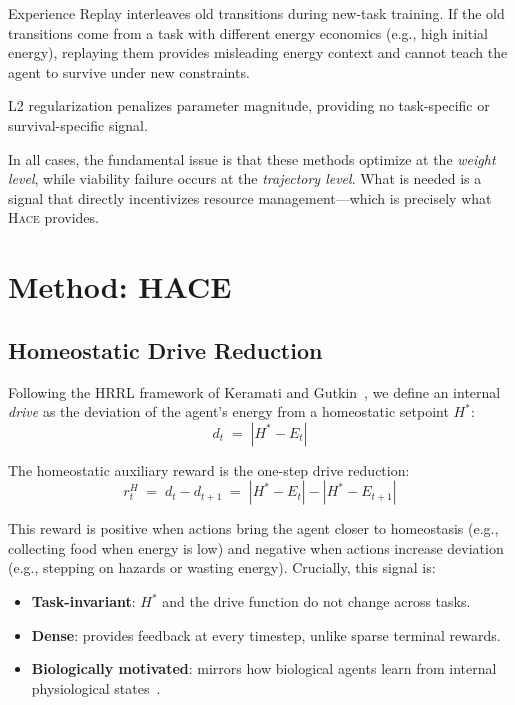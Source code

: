 \documentclass{article}
\newcommand{\setpoint}{H^*}
\newcommand{\energy}{E}
\newcommand{\drive}{d}
\newcommand{\rwd}{r}
\newcommand{\hace}{\textsc{Hace}}
\begin{document}
Experience Replay interleaves old transitions during new-task training.
If the old transitions come from a task with different energy economics
(e.g., high initial energy), replaying them provides misleading energy
context and cannot teach the agent to survive under new constraints.

L2 regularization penalizes parameter magnitude, providing no
task-specific or survival-specific signal.

In all cases, the fundamental issue is that these methods optimize at the
\emph{weight level}, while viability failure occurs at the
\emph{trajectory level}. What is needed is a signal that directly
incentivizes resource management---which is precisely what \hace{} provides.

\section{Method: HACE}
\label{sec:hace}

\subsection{Homeostatic Drive Reduction}

Following the HRRL framework of Keramati and Gutkin~\citep{keramati2014},
we define an internal \emph{drive} as the deviation of the agent's energy
from a homeostatic setpoint $\setpoint$:
\begin{equation}
  \drive_t \;=\; |\setpoint - \energy_t|
\end{equation}

The homeostatic auxiliary reward is the one-step drive reduction:
\begin{equation}
  \rwd_t^H \;=\; \drive_t - \drive_{t+1}
  \;=\; |\setpoint - \energy_t| - |\setpoint - \energy_{t+1}|
  \label{eq:drive_reduction}
\end{equation}

This reward is positive when actions bring the agent closer to homeostasis
(e.g., collecting food when energy is low) and negative when actions
increase deviation (e.g., stepping on hazards or wasting energy). Crucially,
this signal is:

\begin{itemize}[leftmargin=*,topsep=1pt,itemsep=1pt]
  \item \textbf{Task-invariant}: $\setpoint$ and the drive function do
        not change across tasks.
  \item \textbf{Dense}: provides feedback at every timestep, unlike
        sparse terminal rewards.
  \item \textbf{Biologically motivated}: mirrors how biological agents
        learn from internal physiological
        states~\citep{keramati2014,yoshida2018,konidaris2006}.
\end{itemize}
\end{document}
